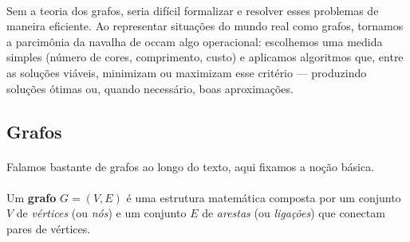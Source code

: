 \documentclass[12pt,a4paper]{article}
\begin{document}
\begin{center}
\label{fig:coloracao}
\end{center}

\paragraph{}
Sem a teoria dos grafos, seria difícil formalizar e resolver esses problemas de maneira eficiente. Ao representar situações do mundo real como grafos, tornamos a parcimônia da navalha de occam algo operacional: escolhemos uma medida simples (número de cores, comprimento, custo) e aplicamos algoritmos que, entre as soluções viáveis, minimizam ou maximizam esse critério — produzindo soluções ótimas ou, quando necessário, boas aproximações.

\subsection{Grafos}
\paragraph{}
Falamos bastante de grafos ao longo do texto, aqui fixamos a noção básica. 

\paragraph{}
Um \textbf{grafo} \(G = (V, E)\) é uma estrutura matemática composta por um conjunto \(V\) de \emph{vértices} (ou \emph{nós}) e um conjunto \(E\) de \emph{arestas} (ou \emph{ligações}) que conectam pares de vértices. 
\end{document}
